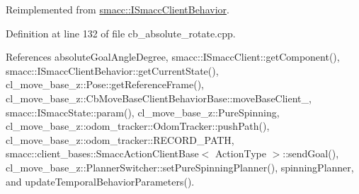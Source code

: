 Reimplemented from \hyperlink{classsmacc_1_1ISmaccClientBehavior_a3ec24a839087c550e1d62a81e48cf530}{smacc\+::\+I\+Smacc\+Client\+Behavior}.



Definition at line 132 of file cb\+\_\+absolute\+\_\+rotate.\+cpp.



References absolute\+Goal\+Angle\+Degree, smacc\+::\+I\+Smacc\+Client\+::get\+Component(), smacc\+::\+I\+Smacc\+Client\+Behavior\+::get\+Current\+State(), cl\+\_\+move\+\_\+base\+\_\+z\+::\+Pose\+::get\+Reference\+Frame(), cl\+\_\+move\+\_\+base\+\_\+z\+::\+Cb\+Move\+Base\+Client\+Behavior\+Base\+::move\+Base\+Client\+\_\+, smacc\+::\+I\+Smacc\+State\+::param(), cl\+\_\+move\+\_\+base\+\_\+z\+::\+Pure\+Spinning, cl\+\_\+move\+\_\+base\+\_\+z\+::odom\+\_\+tracker\+::\+Odom\+Tracker\+::push\+Path(), cl\+\_\+move\+\_\+base\+\_\+z\+::odom\+\_\+tracker\+::\+R\+E\+C\+O\+R\+D\+\_\+\+P\+A\+TH, smacc\+::client\+\_\+bases\+::\+Smacc\+Action\+Client\+Base$<$ Action\+Type $>$\+::send\+Goal(), cl\+\_\+move\+\_\+base\+\_\+z\+::\+Planner\+Switcher\+::set\+Pure\+Spinning\+Planner(), spinning\+Planner, and update\+Temporal\+Behavior\+Parameters().


